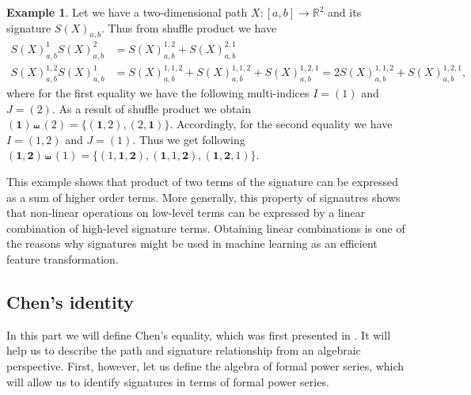 \documentclass[12pt,a4paper]{report}
\theoremstyle{definition}
\newtheorem{example}{Example}
\begin{document}
\begin{example}
Let we have a two-dimensional path $X:[a,b]\rightarrow \mathbb{R}^2$ and its signature $S(X)_{a,b}$. Thus from shuffle product we have
	\begin{equation}
		\begin{aligned}
			S(X)_{a,b}^1 S(X)_{a,b}^2&=S(X)_{a,b}^{1,2}+S(X)_{a,b}^{2,1}\\
			S(X)_{a,b}^{1,2} S(X)_{a,b}^1&=S(X)_{a,b}^{1,1,2}+S(X)_{a,b}^{1,1,2}+S(X)_{a,b}^{1,2,1}=2S(X)_{a,b}^{1,1,2}+S(X)_{a,b}^{1,2,1},
		\end{aligned}
	\end{equation}
	where for the first equality we have the following multi-indices $I=(1)$ and $J=(2)$. As a result of shuffle product we obtain  $(\textbf{1})\shuffle(\textit{2}) = \{(\textbf{1}, \textit{2}), (\textit{2}, \textbf{1})\}$. Accordingly, for the second equality we have $I=(1,2)$ and $J=(1)$. Thus we get following $(\textbf{1},\textbf{2})\shuffle(\textit{1}) = \{(\textit{1},\textbf{1},\textbf{2}), (\textbf{1}, \textit{1},\textbf{2}),(\textbf{1}, \textbf{2},\textit{1})\}$.
	
	This example shows that product of two terms of the signature can be expressed as a sum of higher order terms. More generally, this property of signautres shows that non-linear operations on low-level terms can be expressed by a linear combination of high-level signature terms. Obtaining linear combinations is one of the reasons why signatures might be used in machine learning as an efficient feature transformation.
	
\end{example}

\subsection{Chen's identity}

In this part we will define Chen's equality, which was first presented in \parencite{chen1958integration}. It will help us to describe the path and signature relationship from an algebraic perspective. First, however, let us define the algebra of formal power series, which will allow us to identify signatures in terms of formal power series.
\end{document}

